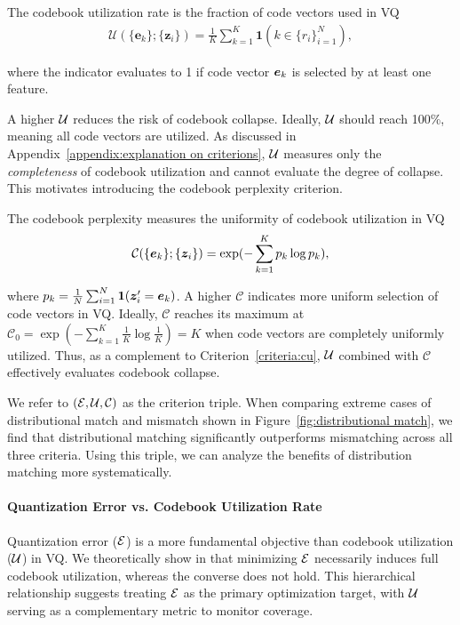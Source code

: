 \begin{proper}\label{criteria:cu} The codebook utilization rate is the fraction of code vectors used in VQ
\begin{align}
\mathcal{U}(\{\bm{e}_k\};\{\bm{z}_i\}) 
= \frac{1}{K} \sum_{k=1}^K \mathbf{1}\left(k \in \{ r_i \}_{i=1}^N \right),
\end{align}
\end{proper}
where the indicator evaluates to 1 if code vector $\bm{e}_k$ is selected by at least one feature. 

A higher $\mathcal{U}$ reduces the risk of codebook collapse. Ideally, $\mathcal{U}$ should reach 100\%, meaning all code vectors are utilized. As discussed in Appendix~\ref{appendix:explanation on criterions}, $\mathcal{U}$ measures only the \emph{completeness} of codebook utilization and cannot evaluate the degree of collapse. This motivates introducing the codebook perplexity criterion.

\begin{proper}\label{criteria:cp} The codebook perplexity measures the uniformity of codebook utilization in VQ
\begin{align}
\mathcal{C}(\{\bm{e}_k\};\{\bm{z}_i\}) = \exp(-\sum_{k=1}^{K} p_k \log p_k),
\end{align} 
\end{proper}
where $p_k =\frac{1}{N}\sum_{i=1}^N{\bm 1}(\bm{z}_i'=\bm{e}_k)$. A higher $\mathcal{C}$ indicates more uniform selection of code vectors in VQ. Ideally, $\mathcal{C}$ reaches its maximum at $\mathcal{C}_{0} = \exp(-\sum_{k=1}^{K} \frac{1}{K} \log \frac{1}{K})=K$ when code vectors are completely uniformly utilized. Thus, as a complement to Criterion~\ref{criteria:cu}, $\mathcal{U}$ combined with $\mathcal{C}$ effectively evaluates codebook collapse.

We refer to $(\mathcal{E}, \mathcal{U}, \mathcal{C})$ as the criterion triple. When comparing extreme cases of distributional match and mismatch shown in Figure~\ref{fig:distributional match}, we find that distributional matching significantly outperforms mismatching across all three criteria. Using this triple, we can analyze the benefits of distribution matching more systematically.

\paragraph{Quantization Error vs. Codebook Utilization Rate}
Quantization error ($\mathcal{E}$) is a more fundamental objective than codebook utilization ($\mathcal{U}$) in VQ. We theoretically show in \cite{Fang2026UnifyingView} that minimizing $\mathcal{E}$ necessarily induces full codebook utilization, whereas the converse does not hold. This hierarchical relationship suggests treating $\mathcal{E}$ as the primary optimization target, with $\mathcal{U}$ serving as a complementary metric to monitor coverage.

